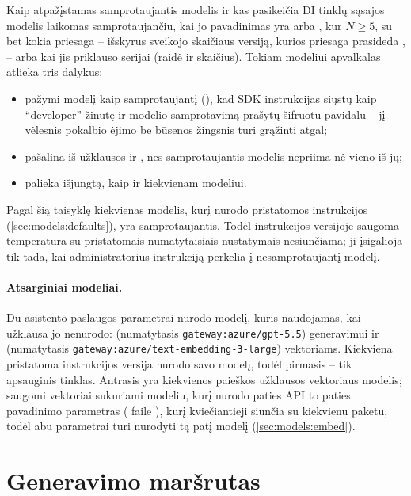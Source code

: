 \begin{codebox}{Kaip atpažįstamas samprotaujantis modelis ir kas pasikeičia}
DI tinklų sąsajos modelis laikomas samprotaujančiu, kai jo pavadinimas yra  arba
, kur $N \ge 5$, su bet kokia priesaga -- išskyrus sveikojo skaičiaus versiją,
kurios priesaga prasideda , -- arba kai jis priklauso  serijai (raidė ir
skaičius). Tokiam modeliui apvalkalas atlieka tris dalykus:
\begin{itemize}
  \item pažymi modelį kaip samprotaujantį (), kad SDK instrukcijas
    siųstų kaip \enquote{developer} žinutę ir modelio samprotavimą prašytų šifruotu pavidalu
    -- jį vėlesnis pokalbio ėjimo be būsenos žingsnis turi grąžinti atgal;
  \item pašalina iš užklausos  ir , nes samprotaujantis modelis
    nepriima nė vieno iš jų;
  \item palieka  išjungtą, kaip ir kiekvienam modeliui.
\end{itemize}
Pagal šią taisyklę kiekvienas modelis, kurį nurodo pristatomos instrukcijos
(\cref{sec:models:defaults}), yra samprotaujantis. Todėl instrukcijos versijoje saugoma
temperatūra su pristatomais numatytaisiais nustatymais nesiunčiama; ji įsigalioja tik tada,
kai administratorius instrukciją perkelia į nesamprotaujantį modelį.
\end{codebox}

\paragraph{Atsarginiai modeliai.} Du asistento paslaugos parametrai nurodo modelį, kuris
naudojamas, kai užklausa jo nenurodo:  (numatytasis
\texttt{gateway:azure/gpt-5.5}) generavimui ir  (numatytasis
\texttt{gateway:azure/text-embedding-3-large}) vektoriams. Kiekviena pristatoma instrukcijos
versija nurodo savo modelį, todėl pirmasis -- tik apsauginis tinklas. Antrasis yra kiekvienos
paieškos užklausos vektoriaus modelis; saugomi vektoriai sukuriami modeliu, kurį nurodo paties API to paties
pavadinimo parametras ( faile ), kurį kviečiantieji
siunčia su kiekvienu paketu, todėl abu parametrai turi nurodyti tą patį modelį
(\cref{sec:models:embed}).


\section{Generavimo maršrutas}\label{sec:models:generate}

